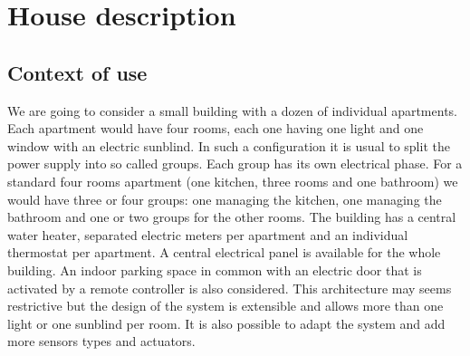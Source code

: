\documentclass{acm_proc_article-sp}
\begin{document}
\section{House description}
\subsection{Context of use}
We are going to consider a small building with a dozen of individual apartments. 
Each apartment would have four rooms, each one having one light and one window with an electric sunblind. 
In such a configuration it is usual to split the power supply into so called groups. 
Each group has its own electrical phase. 
For a standard four rooms apartment (one kitchen, three rooms and one bathroom) we would have three or four groups: one managing the kitchen, one managing the bathroom and one or two groups for the other rooms. 
The building has a central water heater, separated electric meters per apartment and an individual thermostat per apartment. 
A central electrical panel is available for the whole building. An indoor parking space in common with an electric door that is activated by a remote controller is also considered.
This architecture may seems restrictive but the design of the system is extensible and allows more than one light or one sunblind per room.
It is also possible to adapt the system and add more sensors types and actuators.
\end{document}
